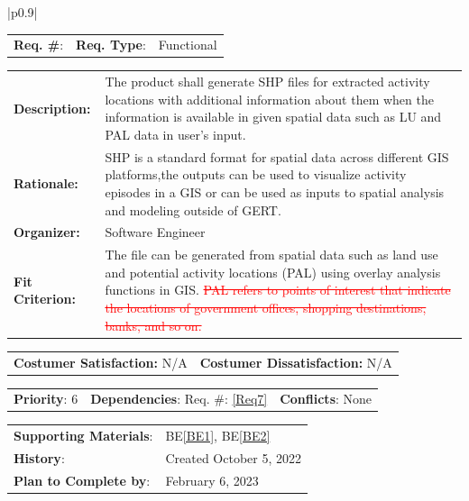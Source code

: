 \documentclass[12pt, titlepage]{article}
\newcommand{\beref}[1]{BE\ref{#1}}
\newcounter{reqnum}
\newcommand{\reqthereqnum}{\textbf{Req. \#}: \thereqnum}
\newcommand{\reqref}[1]{Req. \#: \ref{#1}}
\newenvironment{boxed}
    {\begin{center}
    \begin{tabular}{|p{0.9\textwidth}|}
    \hline\\
    }
    { 
    \\\\\hline
    \end{tabular} 
    \end{center}
    }
\begin{document}
\begin{boxed}
\begin{tabular}{l r r}
{reqnum} \reqthereqnum \label{Req9} & {\bf Req. Type}: &  Functional\\
\end{tabular}
\newline
\begin{tabular}{l p{11.5cm}}
    {\bf Description:} & The product shall generate SHP files for extracted activity locations with additional information about them when the information is available in given spatial data such as LU and PAL data in user's input.  \\
    {\bf Rationale:} & SHP is a standard format for spatial data across different GIS platforms,the outputs can be used to visualize activity episodes in a GIS or can be used as inputs to spatial analysis and modeling outside of GERT.\\
    {\bf Organizer:} & Software Engineer\\
    {\bf Fit Criterion:} & The file can be generated from spatial data such as land use and potential activity locations (PAL) using overlay analysis functions in GIS. \textcolor{red}{\sout{PAL refers to points of interest that indicate the locations of government offices, shopping destinations, banks, and so on.}}\\
\end{tabular}
\begin{tabular}{l r}
{\bf Costumer Satisfaction:} N/A &  {\bf Costumer Dissatisfaction:}  N/A\\
\end{tabular}
\begin{tabular}{l r r}
    {\bf Priority}: 6 & {\bf Dependencies}:  \reqref{Req7}  & {\bf Conflicts}: None \\
\end{tabular}
\begin{tabular}{l l}
     {\bf Supporting Materials}:& 
     \beref{BE1}, \beref{BE2} \\ 
     {\bf History}: & Created October 5, 2022\\
     {\bf Plan to Complete by}: & February 6, 2023\\
\end{tabular}
\end{boxed}
\end{document}
